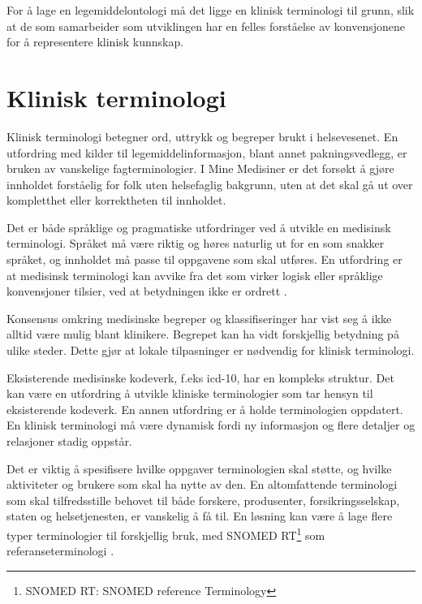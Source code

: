 For å lage en legemiddelontologi må det ligge en klinisk terminologi til grunn, slik at de som samarbeider som utviklingen har en felles forståelse av konvensjonene for å representere klinisk kunnskap. 

\section{Klinisk terminologi}
Klinisk terminologi betegner ord, uttrykk og begreper brukt i helsevesenet. En utfordring med kilder til legemiddelinformasjon, blant annet pakningsvedlegg, er bruken av vanskelige fagterminologier. I Mine Medisiner er det forsøkt å gjøre innholdet forståelig for folk uten helsefaglig bakgrunn, uten at det skal gå ut over kompletthet eller korrektheten til innholdet. 

Det er både språklige og pragmatiske utfordringer ved å utvikle en medisinsk terminologi. Språket må være riktig og høres naturlig ut for en som snakker språket, og innholdet må passe til oppgavene som skal utføres. En utfordring er at medisinsk terminologi kan avvike fra det som virker logisk eller språklige konvensjoner tilsier, ved at betydningen ikke er ordrett  \citep{rector1999clinical}.

Konsensus omkring medisinske begreper og klassifiseringer har vist seg å ikke alltid være mulig blant klinikere. Begrepet kan ha vidt forskjellig betydning på ulike steder. Dette gjør at lokale tilpasninger er nødvendig for klinisk terminologi. 

Eksisterende medisinske kodeverk, f.eks \acrshort{icd}-10, har en kompleks struktur. Det kan være en utfordring å utvikle kliniske terminologier som tar hensyn til eksisterende kodeverk. En annen utfordring er å holde terminologien oppdatert. En klinisk terminologi må være dynamisk fordi ny informasjon og flere detaljer og relasjoner stadig oppstår. 

Det er viktig å spesifisere hvilke oppgaver terminologien skal støtte, og hvilke aktiviteter og brukere som skal ha nytte av den. En altomfattende terminologi som skal tilfredsstille behovet til både forskere, produsenter, forsikringsselskap, staten og helsetjenesten, er vanskelig å få til. En løsning kan være å lage flere typer terminologier til forskjellig bruk, med SNOMED RT\footnote{SNOMED RT: SNOMED reference Terminology} som referanseterminologi \citep{spackman1997snomed}. 



